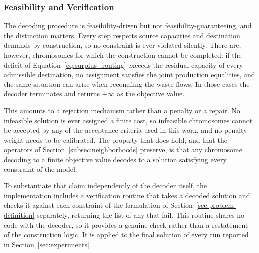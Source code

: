 \documentclass[preprint,12pt,authoryear]{elsarticle}
\begin{document}
\subsubsection{Feasibility and Verification}
\label{subsubsec:feasibility}

The decoding procedure is feasibility-driven but not feasibility-guaranteeing, and the distinction matters. Every step respects source capacities and destination demands by
construction, so no constraint is ever violated silently. There are, however, chromosomes for which the construction cannot be completed: if the deficit of
Equation~\eqref{eq:surplus_routing} exceeds the residual capacity of every admissible destination, no assignment satisfies the joint production equalities, and the same situation can
arise when reconciling the waste flows. In those cases the decoder terminates and returns $+\infty$ as the objective value.

This amounts to a rejection mechanism rather than a penalty or a repair. No infeasible solution is ever assigned a finite cost, so infeasible chromosomes cannot be accepted by any of
the acceptance criteria used in this work, and no penalty weight needs to be calibrated. The property that does hold, and that the operators of Section~\ref{subsec:neighborhoods}
preserve, is that any chromosome decoding to a finite objective value decodes to a solution satisfying every constraint of the model.

To substantiate that claim independently of the decoder itself, the implementation includes a verification routine that takes a decoded solution and checks it against each constraint
of the formulation of Section~\ref{sec:problem-definition} separately, returning the list of any that fail. This routine shares no code with the decoder, so it provides a genuine
check rather than a restatement of the construction logic. It is applied to the final solution of every run reported in Section~\ref{sec:experiments}.
\end{document}
